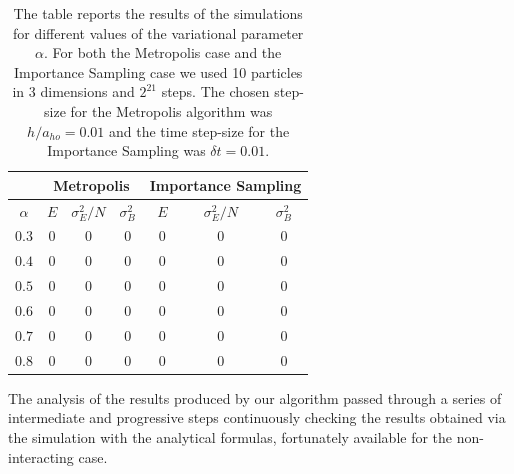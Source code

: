 \begin{table}[hbtp]
    \vspace{15pt}
    \centering
    \begin{tabular}{c|ccc|ccc}
         & \multicolumn{3}{c|}{Metropolis} & \multicolumn{3}{c}{Importance Sampling} \\
        \hline
         $\alpha$ & $E$ & $\sigma^2_E/N$ & $\sigma^2_B$ & $E$ & $\sigma^2_E/N$ & $\sigma^2_B$ \\
         \hline
         $0.3$ & $0$ & $0$ & $0$ & $0$  & $0$ & $0$ \\
         $0.4$ & $0$ & $0$ & $0$ & $0$  & $0$ & $0$ \\
         $0.5$ & $0$ & $0$ & $0$ & $0$  & $0$ & $0$ \\
         $0.6$ & $0$ & $0$ & $0$ & $0$  & $0$ & $0$ \\
         $0.7$ & $0$ & $0$ & $0$ & $0$  & $0$ & $0$ \\
         $0.8$ & $0$ & $0$ & $0$ & $0$  & $0$ & $0$ \\
         \hline
    \end{tabular}
    \caption{The table reports the results of the simulations for different values of the variational parameter $\alpha$. For both the Metropolis case and the Importance Sampling case we used 10 particles in 3 dimensions and $2^{21}$ steps. The chosen step-size for the Metropolis algorithm was $h/a_{ho}=0.01$ and the time step-size for the Importance Sampling was $\delta t = 0.01$.}
    \label{tab:varying_alpha_noninteracting}
\end{table}

The analysis of the results produced by our algorithm passed through a series of intermediate and progressive steps continuously checking the results obtained via the simulation with the analytical formulas, fortunately available for the non-interacting case.

